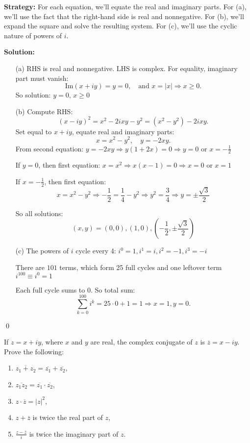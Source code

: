 \noindent\textbf{Strategy:} For each equation, we'll equate the real and imaginary parts. For (a), we'll use the fact that the right-hand side is real and nonnegative. For (b), we'll expand the square and solve the resulting system. For (c), we'll use the cyclic nature of powers of $i$.

\bigskip\noindent\textbf{Solution:}

\begin{itemize}
\item[(a)] RHS is real and nonnegative. LHS is complex. For equality, imaginary part must vanish:
\[
\text{Im}(x + iy) = y = 0, \quad \text{and } x = |x| \Rightarrow x \geq 0.
\]
So solution: \( y = 0,\, x \geq 0 \)

\item[(b)] Compute RHS:
\[
(x - iy)^2 = x^2 - 2ixy - y^2 = (x^2 - y^2) - 2ixy.
\]
Set equal to \( x + iy \), equate real and imaginary parts:
\[
x = x^2 - y^2,\quad y = -2xy.
\]
From second equation: \( y = -2xy \Rightarrow y(1 + 2x) = 0 \Rightarrow y = 0 \) or \( x = -\frac{1}{2} \)

If \( y = 0 \), then first equation: \( x = x^2 \Rightarrow x(x - 1) = 0 \Rightarrow x = 0 \) or \( x = 1 \)

If \( x = -\frac{1}{2} \), then first equation:
\[
x = x^2 - y^2 \Rightarrow -\frac{1}{2} = \frac{1}{4} - y^2 \Rightarrow y^2 = \frac{3}{4} \Rightarrow y = \pm \frac{\sqrt{3}}{2}
\]

So all solutions:
\[
(x,y) = (0,0), (1,0), \left(-\frac{1}{2}, \pm \frac{\sqrt{3}}{2} \right)
\]

\item[(c)] The powers of \( i \) cycle every 4: \( i^0 = 1, i^1 = i, i^2 = -1, i^3 = -i \)

There are \( 101 \) terms, which form 25 full cycles and one leftover term \( i^{100} \equiv i^0 = 1 \)

Each full cycle sums to 0. So total sum:
\[
\sum_{k=0}^{100} i^k = 25 \cdot 0 + 1 = 1
\Rightarrow x = 1, y = 0.
\]
\end{itemize}\qed


\begin{problembox}
If \( z = x + iy \), where \( x \) and \( y \) are real, the complex conjugate of \( z \) is \( \overline{z} = x - iy \). Prove the following:
\begin{enumerate}[label=\alph*)]
\item \( \overline{z_1 + z_2} = \overline{z_1} + \overline{z_2} \),
\item \( \overline{z_1 z_2} = \overline{z_1} \cdot \overline{z_2} \),
\item \( z \cdot \overline{z} = |z|^2 \),
\item \( z + \overline{z} \) is twice the real part of \( z \),
\item \( \frac{z - \overline{z}}{i} \) is twice the imaginary part of \( z \).
\end{enumerate}
\end{problembox}

